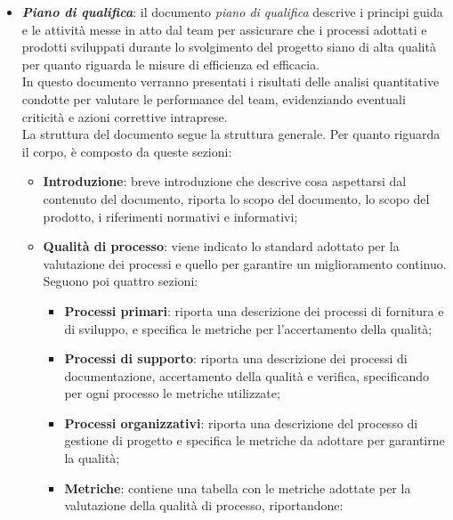 \begin{itemize}
            \item \textit{\textbf{Piano di qualifica}}: il documento \textit{piano di qualifica} descrive i principi guida e le attività messe in atto dal team per assicurare che i processi adottati e prodotti sviluppati durante lo svolgimento del progetto siano di alta qualità per quanto riguarda le misure di efficienza ed efficacia.\\
            In questo documento verranno presentati i risultati delle analisi quantitative condotte per valutare le performance del team, evidenziando eventuali criticità e azioni correttive intraprese.
            \\La struttura del documento segue la struttura generale. Per quanto riguarda il corpo, è composto da queste sezioni:
            \begin{itemize}
                \item \textbf{Introduzione}: breve introduzione che descrive cosa aspettarsi dal contenuto del documento, riporta lo scopo del documento, lo scopo del prodotto, i riferimenti normativi e informativi;
                \item \textbf{Qualità di processo}: viene indicato lo standard adottato per la valutazione dei processi e quello per garantire un miglioramento continuo.\\
                                                    Seguono poi quattro sezioni:
                                                    \begin{itemize}
                                                        \item \textbf{Processi primari}: riporta una descrizione dei processi di fornitura e di sviluppo, e specifica le metriche per l'accertamento della qualità;
                                                        \item \textbf{Processi di supporto}: riporta una descrizione dei processi di documentazione, accertamento della qualità e verifica, specificando per ogni processo le metriche utilizzate; 
                                                        \item \textbf{Processi organizzativi}: riporta una descrizione del processo di gestione di progetto e specifica le metriche da adottare per garantirne la qualità;
                                                        \item \textbf{Metriche}: contiene una tabella con le metriche adottate per la valutazione della qualità di processo, riportandone:
                                                        \begin{itemize}

\end{itemize}
\end{itemize}
\end{itemize}
\end{itemize}
